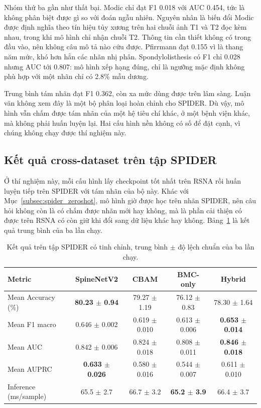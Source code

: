 Nhóm thứ ba gần như thất bại. Modic chỉ đạt F1 0.018 với AUC 0.454, tức là không phân biệt được gì so với đoán ngẫu nhiên. Nguyên nhân là biến đổi Modic được định nghĩa theo tín hiệu tủy xương trên hai chuỗi ảnh T1 và T2 đọc kèm nhau, trong khi mô hình chỉ nhận chuỗi T2. Thông tin cần thiết không có trong đầu vào, nên không câu mô tả nào cứu được. Pfirrmann đạt 0.155 vì là thang năm mức, khó hơn hẳn các nhãn nhị phân. Spondylolisthesis có F1 chỉ 0.028 nhưng AUC tới 0.807: mô hình xếp hạng đúng, chỉ là ngưỡng mặc định không phù hợp với một nhãn chỉ có 2.8\% mẫu dương.

Trung bình tám nhãn đạt F1 0.362, còn xa mức dùng được trên lâm sàng. Luận văn không xem đây là một bộ phân loại hoàn chỉnh cho SPIDER. Dù vậy, mô hình vẫn chấm được tám nhãn của một hệ tiêu chí khác, ở một bệnh viện khác, mà không phải huấn luyện lại. Hai cấu hình nền không có số để đặt cạnh, vì chúng không chạy được thí nghiệm này.

\subsection{Kết quả cross-dataset trên tập SPIDER}
\label{sec:spider_transfer_sec}
Ở thí nghiệm này, mỗi cấu hình lấy checkpoint tốt nhất trên RSNA rồi huấn luyện tiếp trên SPIDER với tám nhãn của bộ này. Khác với Mục~\ref{subsec:spider_zeroshot}, mô hình giờ được học trên nhãn SPIDER, nên câu hỏi không còn là có chấm được nhãn mới hay không, mà là phần cải thiện có được trên RSNA có còn giữ khi đổi sang dữ liệu khác hay không. Bảng~\ref{tab:spider_aggregate} là kết quả trung bình của ba lần chạy.

\begin{table}[htbp]
\centering
\caption{Kết quả trên tập SPIDER có tinh chỉnh, trung bình $\pm$ độ lệch chuẩn của ba lần chạy.}
\label{tab:spider_aggregate}
\renewcommand{\arraystretch}{1.2}
\setlength{\tabcolsep}{4pt}
\begin{tabular}{lcccc}
\toprule
\textbf{Metric} & \textbf{SpineNetV2} & \textbf{CBAM} & \textbf{BMC-only} & \textbf{Hybrid} \\
\midrule
Mean Accuracy (\%) & \textbf{80.23 $\pm$ 0.94} & 79.27 $\pm$ 1.19 & 76.12 $\pm$ 0.83 & 78.30 $\pm$ 1.64 \\
Mean F1 macro & 0.646 $\pm$ 0.002 & 0.619 $\pm$ 0.010 & 0.613 $\pm$ 0.006 & \textbf{0.653 $\pm$ 0.014} \\
Mean AUC      & 0.842 $\pm$ 0.006 & 0.824 $\pm$ 0.018 & 0.808 $\pm$ 0.011 & \textbf{0.846 $\pm$ 0.018} \\
Mean AUPRC    & \textbf{0.633 $\pm$ 0.026} & 0.580 $\pm$ 0.016 & 0.544 $\pm$ 0.007 & 0.611 $\pm$ 0.010 \\
\midrule
Inference (ms/sample) & 65.5 $\pm$ 2.7 & 66.7 $\pm$ 3.2 & \textbf{65.2 $\pm$ 3.9} & 66.4 $\pm$ 3.7 \\
\bottomrule
\end{tabular}
\end{table}

